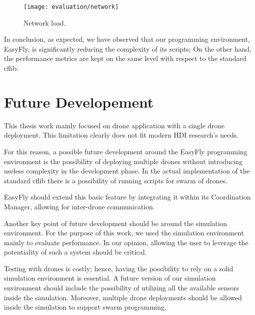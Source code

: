 \begin{figure}[tb]
    \centering
    \texttt{[image: evaluation/network]}
    \caption{Network load.}\label{fig:network_load}
\end{figure}

In conclusion, as expected, we have observed that our programming environment, EasyFly, is significantly reducing the complexity of its scripts; 
On the other hand, the performance metrics are kept on the same level with respect to the standard cflib.

\section{Future Developement}\label{subsec:future_developement}
This thesis work mainly focused on drone application with a single drone deployment. 
This limitation clearly does not fit modern HDI research's needs. 

For this reason, a possible future development around the EasyFly programming environment is the possibility of deploying multiple drones without introducing useless complexity in the development phase.
In the actual implementation of the standard cflib there is a possibility of running scripts for swarm of drones.

EasyFly should extend this basic feature by integrating it within its Coordination Manager, allowing for inter-drone communication.

Another key point of future development should be around the simulation environment. 
For the purpose of this work, we used the simulation environment mainly to evaluate performance.
In our opinion, allowing the user to leverage the potentiality of such a system should be critical.

Testing with drones is costly; hence, having the possibility to rely on a solid simulation environment is essential.
A future version of our simulation environment should include the possibility of utilizing all the available sensors inside the simulation. 
Moreover, multiple drone deployments should be allowed inside the simulation to support swarm programming.